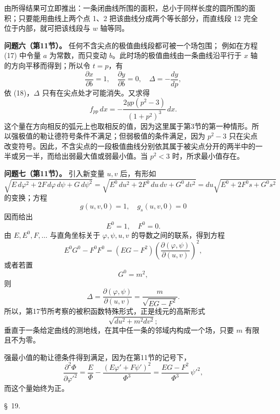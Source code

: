 \documentclass[11pt,a4paper,leqno]{article}
\begin{document}
由所得结果可立即推出：一条闭曲线所围的面积，总小于同样长度的圆所围的面积；只要能用曲线上两个点 1、2 把该曲线分成两个等长部分，而直线段 12 完全位于内部，就可把该线段与 $w$ 轴等同。

\bigskip

\noindent\textbf{问题六（第11节）。} 任何不含尖点的极值曲线段都可被一个场包围；
例如在方程 (17) 中令量 $a$ 为常数，而只变动 $b$。此时场的极值曲线由一条曲线沿平行于 $x$ 轴的方向平移而得到；所以令 $t=p$，有
\[
\frac{\partial x}{\partial b}=1,\quad
\frac{\partial y}{\partial b}=0,\quad
\Delta=-\frac{dy}{dp},
\]
依 (18)，$\Delta$ 只有在尖点处才可能消失。又求得
\[
f_{pp}\,dx=-\frac{2yp(p^2-3)}{(1+p^2)^3}\,dx.
\]
这个量在方向相反的弧元上也取相反的值，因为这里属于第3节的第一种情形。所以强极值的勒让德符号条件不满足；但弱极值的条件满足，因为 $p^2-3$ 只在尖点改变符号。因此，不含尖点的一段极值曲线分别依其属于被尖点分开的两半中的一半或另一半，而给出弱最大值或弱最小值。当 $p^2<3$ 时，所求最小值存在。

\bigskip

\noindent\textbf{问题七（第11节）。} 引入新变量 $u,v$ 后，有形如
\[
\sqrt{E\,d\varphi^2+2F\,d\varphi\,d\psi+G\,d\psi^2}
=
\sqrt{E^0\,du^2+2F^0\,du\,dv+G^0\,dv^2}
=
du\sqrt{E^0+2F^0s+G^0s^2}
\]
的变换；方程
\[
g(u,v,0)=1,\quad g_s(u,v,0)=0
\]
因而给出
\[
E^0=1,\quad F^0=0.
\]
由 $E,E^0,F,\ldots$ 与直角坐标关于 $\varphi,\psi,u,v$ 的导数之间的联系，得到方程
\[
E^0G^0-F^0F^0=(EG-F^2)\left(\frac{\partial(\varphi,\psi)}{\partial(u,v)}\right)^2,
\]
或者若置
\[
G^0=m^2,
\]
则
\[
\Delta=\frac{\partial(\varphi,\psi)}{\partial(u,v)}
=\frac{m}{\sqrt{EG-F^2}}.
\]
所以，第17节所考察的被积函数特殊形式，正是线元的高斯形式
\[
\sqrt{du^2+m^2dv^2};
\]
垂直于一条给定曲线的测地线，在其中任一条的邻域内构成一个场，只要 $m$ 有限且不为零。

强最小值的勒让德条件得到满足，因为在第11节的记号下，
\[
\frac{\partial^2\Phi}{\partial\varphi'^2}
=
\frac{E}{\Phi}
-
\frac{(E\varphi'+F\psi')^2}{\Phi^3}
=
\frac{EG-F^2}{\Phi^3}\,\psi'^2,
\]
而这个量始终为正。

\begin{center}{\large \S~19.}\end{center}
\end{document}

